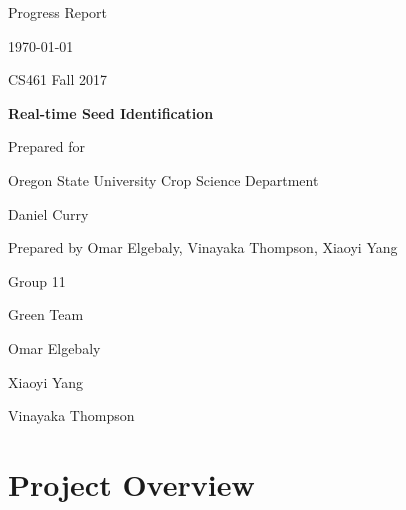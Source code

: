 \documentclass[onecolumn, draftclsnofoot,10pt, compsoc]{IEEEtran}
\def \CapstoneTeamName{			Green Team}
\def \CapstoneTeamNumber{		11}
\def \GroupMemberOne{			Omar Elgebaly}
\def \GroupMemberTwo{			Xiaoyi Yang}
\def \GroupMemberThree{			Vinayaka Thompson}
\def \CapstoneProjectName{		Real-time Seed Identification}
\def \CapstoneSponsorCompany{	Oregon State University Crop Science Department}
\def \CapstoneSponsorPerson{	Daniel Curry}
\newcommand{\NameSigPair}[1]{\par
	\makebox[2.75in][r]{#1} \hfil 	\makebox[3.25in]{\makebox[2.25in]{\hrulefill} \hfill		\makebox[.75in]{\hrulefill}}
	\par\vspace{-12pt} \textit{\tiny\noindent
		\makebox[2.75in]{} \hfil		\makebox[3.25in]{\makebox[2.25in][r]{Signature} \hfill	\makebox[.75in][r]{Date}}}}
\renewcommand{\NameSigPair}[1]{#1}
\begin{document}
	\begin{titlepage}
		\begin{singlespace}
			\hfill 
			\par\vspace{.2in}
			\centering
			\scshape{
				\huge Progress Report \par
				{\large\today}\par
				{\large CS461 Fall 2017}\par
				\vspace{.5in}
				\textbf{\Huge\CapstoneProjectName}\par
				\vfill
				{\large Prepared for}\par
				\Huge \CapstoneSponsorCompany\par
				\vspace{5pt}
				{\Large\NameSigPair{\CapstoneSponsorPerson}\par}
				{\large Prepared by Omar Elgebaly, Vinayaka Thompson, Xiaoyi Yang}\par
				Group\CapstoneTeamNumber\par
				\CapstoneTeamName\par 
				\vspace{5pt}
				{\Large
					\NameSigPair{\GroupMemberOne}\par
					\NameSigPair{\GroupMemberTwo}\par
					\NameSigPair{\GroupMemberThree}\par
				}
				\vspace{20pt}
			}
			\begin{abstract}
				
				
			\end{abstract}     
			
		\end{singlespace}
	\end{titlepage}
	\newpage
	\tableofcontents
	\clearpage
	
	
	\section{Project Overview}
	
\end{document}
